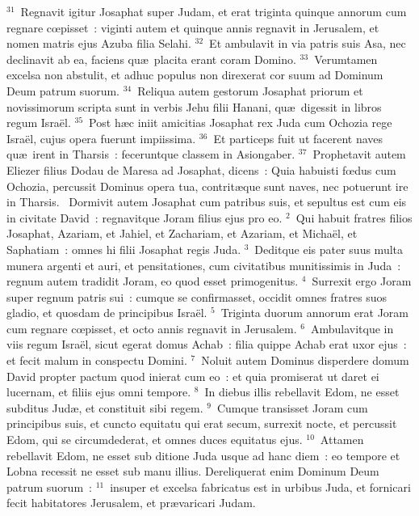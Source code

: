 ${}^{31}$~Regnavit igitur Josaphat super Judam, et erat triginta quinque annorum cum regnare cœpisset~: viginti autem et quinque annis regnavit in Jerusalem, et nomen matris ejus Azuba filia Selahi.
${}^{32}$~Et ambulavit in via patris suis Asa, nec declinavit ab ea, faciens qu\ae\ placita erant coram Domino.
${}^{33}$~Verumtamen excelsa non abstulit, et adhuc populus non direxerat cor suum ad Dominum Deum patrum suorum.
${}^{34}$~Reliqua autem gestorum Josaphat priorum et novissimorum scripta sunt in verbis Jehu filii Hanani, qu\ae\ digessit in libros regum Isra\"el.
${}^{35}$~Post h\ae c iniit amicitias Josaphat rex Juda cum Ochozia rege Isra\"el, cujus opera fuerunt impiissima.
${}^{36}$~Et particeps fuit ut facerent naves qu\ae\ irent in Tharsis~: feceruntque classem in Asiongaber.
${}^{37}$~Prophetavit autem Eliezer filius Dodau de Maresa ad Josaphat, dicens~: Quia habuisti fœdus cum Ochozia, percussit Dominus opera tua, contrit\ae que sunt naves, nec potuerunt ire in Tharsis.
~Dormivit autem Josaphat cum patribus suis, et sepultus est cum eis in civitate David~: regnavitque Joram filius ejus pro eo.
${}^{2}$~Qui habuit fratres filios Josaphat, Azariam, et Jahiel, et Zachariam, et Azariam, et Micha\"el, et Saphatiam~: omnes hi filii Josaphat regis Juda.
${}^{3}$~Deditque eis pater suus multa munera argenti et auri, et pensitationes, cum civitatibus munitissimis in Juda~: regnum autem tradidit Joram, eo quod esset primogenitus.
${}^{4}$~Surrexit ergo Joram super regnum patris sui~: cumque se confirmasset, occidit omnes fratres suos gladio, et quosdam de principibus Isra\"el.
${}^{5}$~Triginta duorum annorum erat Joram cum regnare cœpisset, et octo annis regnavit in Jerusalem.
${}^{6}$~Ambulavitque in viis regum Isra\"el, sicut egerat domus Achab~: filia quippe Achab erat uxor ejus~: et fecit malum in conspectu Domini.
${}^{7}$~Noluit autem Dominus disperdere domum David propter pactum quod inierat cum eo~: et quia promiserat ut daret ei lucernam, et filiis ejus omni tempore.
${}^{8}$~In diebus illis rebellavit Edom, ne esset subditus Jud\ae , et constituit sibi regem.
${}^{9}$~Cumque transisset Joram cum principibus suis, et cuncto equitatu qui erat secum, surrexit nocte, et percussit Edom, qui se circumdederat, et omnes duces equitatus ejus.
${}^{10}$~Attamen rebellavit Edom, ne esset sub ditione Juda usque ad hanc diem~: eo tempore et Lobna recessit ne esset sub manu illius. Dereliquerat enim Dominum Deum patrum suorum~:
${}^{11}$~insuper et excelsa fabricatus est in urbibus Juda, et fornicari fecit habitatores Jerusalem, et pr\ae varicari Judam.


